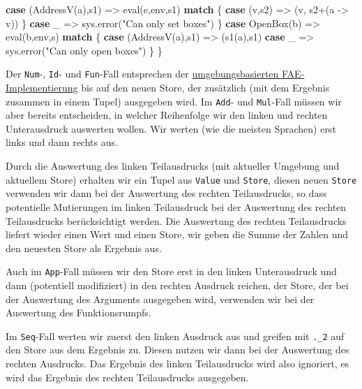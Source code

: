 \documentclass[]{article}
\newenvironment{Shaded}{}{}
\newcommand{\FunctionTok}[1]{\textcolor[rgb]{0.02,0.16,0.49}{#1}}
\newcommand{\KeywordTok}[1]{\textcolor[rgb]{0.00,0.44,0.13}{\textbf{#1}}}
\newcommand{\NormalTok}[1]{#1}
\newcommand{\StringTok}[1]{\textcolor[rgb]{0.25,0.44,0.63}{#1}}
\begin{document}
\begin{Shaded}
\begin{Highlighting}[]
    \KeywordTok{case}\NormalTok{ (}\FunctionTok{AddressV}\NormalTok{(a),s1) =\textgreater{} }\FunctionTok{eval}\NormalTok{(e,env,s1) }\KeywordTok{match}\NormalTok{ \{}
      \KeywordTok{case}\NormalTok{ (v,s2) =\textgreater{} (v, s2+(a {-}\textgreater{} v))}
\NormalTok{    \}}
    \KeywordTok{case}\NormalTok{ \_ =\textgreater{} sys.}\FunctionTok{error}\NormalTok{(}\StringTok{"Can only set boxes"}\NormalTok{)}
\NormalTok{  \}}
  \KeywordTok{case} \FunctionTok{OpenBox}\NormalTok{(b) =\textgreater{}  }\FunctionTok{eval}\NormalTok{(b,env,s) }\KeywordTok{match}\NormalTok{ \{}
    \KeywordTok{case}\NormalTok{ (}\FunctionTok{AddressV}\NormalTok{(a),s1) =\textgreater{} (}\FunctionTok{s1}\NormalTok{(a),s1)}
    \KeywordTok{case}\NormalTok{ \_ =\textgreater{} sys.}\FunctionTok{error}\NormalTok{(}\StringTok{"Can only open boxes"}\NormalTok{)}
\NormalTok{  \}}
\NormalTok{\}}
\end{Highlighting}
\end{Shaded}

Der \texttt{Num}-, \texttt{Id}- und \texttt{Fun}-Fall entsprechen der
\protect\hyperlink{umgebungsbasierter-interpreter-a}{umgebungsbasierten
FAE-Implementierung} bis auf den neuen Store, der zusätzlich (mit dem
Ergebnis zusammen in einem Tupel) ausgegeben wird. Im \texttt{Add}- und
\texttt{Mul}-Fall müssen wir aber bereits entscheiden, in welcher
Reihenfolge wir den linken und rechten Unterausdruck auswerten wollen.
Wir werten (wie die meisten Sprachen) erst links und dann rechts aus.

Durch die Auswertung des linken Teilausdrucks (mit aktueller Umgebung
und aktuellem Store) erhalten wir ein Tupel aus \texttt{Value} und
\texttt{Store}, diesen neuen \texttt{Store} verwenden wir dann bei der
Auswertung des rechten Teilausdrucks, so dass potentielle Mutierungen im
linken Teilausdruck bei der Auswertung des rechten Teilausdrucks
berücksichtigt werden. Die Auswertung des rechten Teilausdrucks liefert
wieder einen Wert und einen Store, wir geben die Summe der Zahlen und
den neuesten Store als Ergebnis aus.

Auch im \texttt{App}-Fall müssen wir den Store erst in den linken
Unterausdruck und dann (potentiell modifiziert) in den rechten Ausdruck
reichen, der Store, der bei der Auswertung des Arguments ausgegeben
wird, verwenden wir bei der Auswertung des Funktionsrumpfs.

Im \texttt{Seq}-Fall werten wir zuerst den linken Ausdruck aus und
greifen mit \texttt{.\_2} auf den Store aus dem Ergebnis zu. Diesen
nutzen wir dann bei der Auswertung des rechten Ausdrucks. Das Ergebnis
des linken Teilausdrucks wird also ignoriert, es wird das Ergebnis des
rechten Teilausdrucks ausgegeben.
\end{document}
